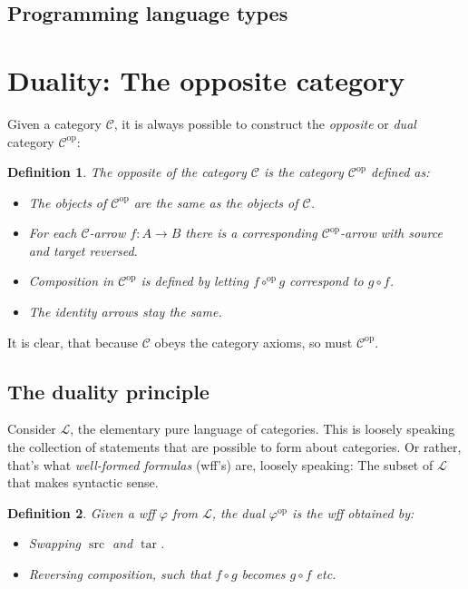 \documentclass[12pt, a4paper]{article}
\newtheorem{definition}{Definition}[section]
\numberwithin{equation}{section}
\DeclareMathOperator{\src}{src}
\DeclareMathOperator{\tar}{tar}
\begin{document}
\subsection{Programming language types}

\section{Duality: The opposite category}
Given a category $\mathcal{C}$, it is always possible to construct the \textit{opposite} or \textit{dual} category $\mathcal{C}^{\textrm{op}}$:

\begin{definition}
The opposite of the category $\mathcal{C}$ is the category $\mathcal{C}^{\textrm{op}}$ defined as:
\begin{itemize}
\item The objects of $\mathcal{C}^{\textrm{op}}$ are the same as the objects of $\mathcal{C}$.
\item For each $\mathcal{C}$-arrow $f: A\rightarrow B$ there is a corresponding $\mathcal{C}^{\textrm{op}}$-arrow with source and target reversed.
\item Composition in $\mathcal{C}^{\textrm{op}}$ is defined by letting $f\circ^{\textrm{op}}g$ correspond to $g\circ f$.
\item The identity arrows stay the same.
\end{itemize}
\end{definition}

It is clear, that because $\mathcal{C}$ obeys the category axioms, so must $\mathcal{C}^{\textrm{op}}$.

\subsection{The duality principle}
Consider $\mathcal{L}$, the elementary pure language of categories. This is loosely speaking the collection of statements that are possible to form about categories. Or rather, that's what \textit{well-formed formulas} (wff's) are, loosely speaking: The subset of $\mathcal{L}$ that makes syntactic sense.

\begin{definition}
Given a wff $\varphi$ from $\mathcal{L}$, the dual $\varphi^{\textrm{op}}$ is the wff obtained by:
\begin{itemize}
\item Swapping $\src$ and $\tar$.
\item Reversing composition, such that $f\circ g$ becomes $g\circ f$ etc.
\end{itemize}
\end{definition}
\end{document}
